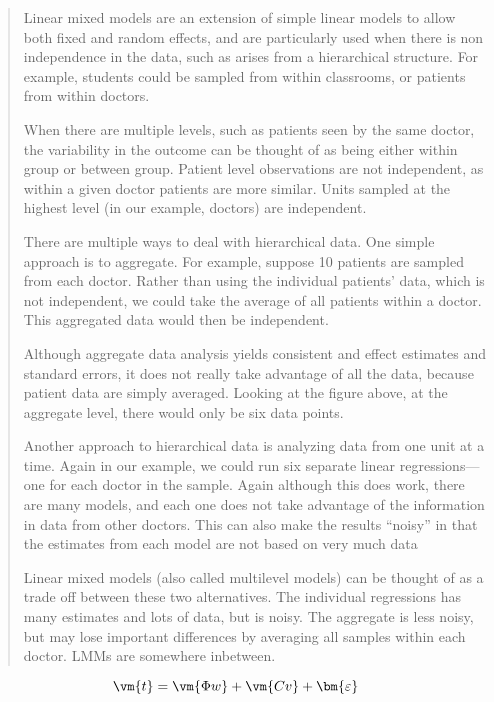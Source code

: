 \documentclass[a4paper,10pt]{article}
\begin{document}
\begin{quotation}
Linear mixed models are an extension of simple linear models to allow both fixed and random effects, and are particularly used when there is non independence in the data, such as arises from a hierarchical structure.
For example, students could be sampled from within classrooms, or patients from within doctors.

When there are multiple levels, such as patients seen by the same doctor, the variability in the outcome can be thought of as being either within group or between group.
Patient level observations are not independent, as within a given doctor patients are more similar.
Units sampled at the highest level (in our example, doctors) are independent.

There are multiple ways to deal with hierarchical data. One simple approach is to aggregate. For example, suppose 10 patients are sampled from each doctor. Rather than using the individual patients’ data, which is not independent, we could take the average of all patients within a doctor. This aggregated data would then be independent.

Although aggregate data analysis yields consistent and effect estimates and standard errors, it does not really take advantage of all the data, because patient data are simply averaged. Looking at the figure above, at the aggregate level, there would only be six data points.

Another approach to hierarchical data is analyzing data from one unit at a time. Again in our example, we could run six separate linear regressions—one for each doctor in the sample. Again although this does work, there are many models, and each one does not take advantage of the information in data from other doctors. This can also make the results “noisy” in that the estimates from each model are not based on very much data

Linear mixed models (also called multilevel models) can be thought of as a trade off between these two alternatives. The individual regressions has many estimates and lots of data, but is noisy. The aggregate is less noisy, but may lose important differences by averaging all samples within each doctor. LMMs are somewhere inbetween.

\end{quotation}

\begin{equation}
 \vm{t} = \vm{\Phi w} + \vm{C v}  + \bm{\varepsilon}
\end{equation}
\end{document}
